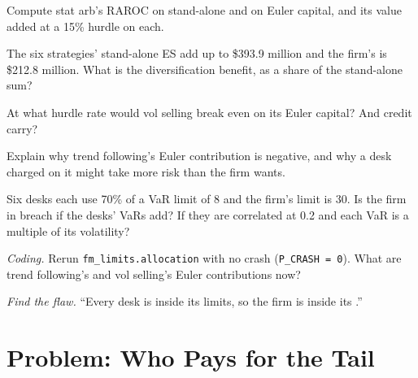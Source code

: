 \begin{exercise}[$\star$]\label{exo:fm:limits-and-capital-allocation:2}
Compute stat arb's RAROC on stand-alone and on Euler capital, and its value added at a 15\% hurdle on each.
\end{exercise}

\begin{exercise}[$\star$]\label{exo:fm:limits-and-capital-allocation:3}
The six strategies' stand-alone ES add up to \$393.9 million and the firm's is \$212.8 million. What is the diversification benefit, as a share of
the stand-alone sum?
\end{exercise}

\begin{exercise}[$\star\star$]\label{exo:fm:limits-and-capital-allocation:4}
At what hurdle rate would vol selling break even on its Euler capital? And credit carry?
\end{exercise}

\begin{exercise}[$\star\star$]\label{exo:fm:limits-and-capital-allocation:5}
Explain why trend following's Euler contribution is negative, and why a desk charged on it might take more risk than the firm wants.
\end{exercise}

\begin{exercise}[$\star\star$]\label{exo:fm:limits-and-capital-allocation:6}
Six desks each use 70\% of a VaR limit of 8 and the firm's limit is 30. Is the firm in breach if the desks' VaRs add? If they are correlated at
0.2 and each VaR is a multiple of its volatility?
\end{exercise}

\begin{exercise}[$\star\star\star$]\label{exo:fm:limits-and-capital-allocation:7}
\emph{Coding.} Rerun \texttt{fm\_limits.allocation} with no crash (\texttt{P\_CRASH = 0}). What are trend following's and vol selling's Euler
contributions now?
\end{exercise}

\begin{exercise}[$\star\star\star$]\label{exo:fm:limits-and-capital-allocation:8}
\emph{Find the flaw.} ``Every desk is inside its limits, so the firm is inside its .''
\end{exercise}

\section{Problem: Who Pays for the Tail}

